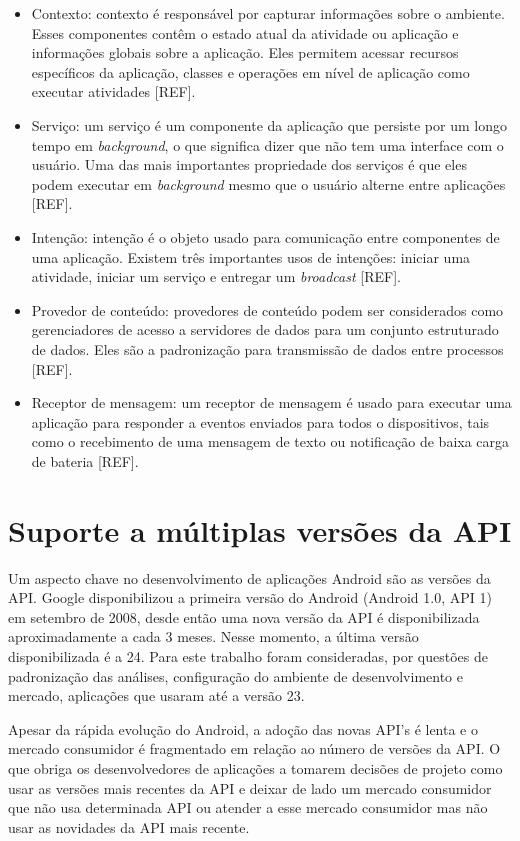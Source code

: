 \begin{itemize}
    \item Contexto: contexto é responsável por capturar informações sobre o ambiente.
    Esses componentes contêm o estado atual da atividade ou aplicação e informações
    globais sobre a aplicação. Eles permitem acessar recursos específicos da aplicação,
    classes e operações em nível de aplicação como executar atividades [REF].
    \item Serviço: um serviço é um componente da aplicação que persiste por um
    longo tempo em \textit{background}, o que significa dizer que não tem uma
    interface com o usuário. Uma das mais importantes propriedade dos serviços é
    que eles podem executar em \textit{background} mesmo que o usuário alterne entre aplicações [REF]. 
    \item Intenção: intenção é o objeto usado para comunicação entre componentes
    de uma aplicação. Existem três importantes usos de intenções: iniciar uma
    atividade, iniciar um serviço e entregar um \textit{broadcast} [REF].
    \item Provedor de conteúdo: provedores de conteúdo podem ser considerados
    como gerenciadores de acesso a servidores de dados para um conjunto estruturado
    de dados. Eles são a padronização para transmissão de dados entre processos [REF].
    \item Receptor de mensagem: um receptor de mensagem é usado para executar uma
    aplicação para responder a eventos enviados para todos o dispositivos, tais
    como o recebimento de uma mensagem de texto ou notificação de baixa carga de bateria [REF].
\end{itemize}



\section{Suporte a múltiplas versões da API} \label{sec:suporte-multiversao}

Um aspecto chave no desenvolvimento de aplicações Android são as versões da API.
Google disponibilizou a primeira versão do Android (Android 1.0, API 1) em setembro
de 2008, desde então uma nova versão da API é disponibilizada aproximadamente a
cada 3 meses. Nesse momento, a última versão disponibilizada é a 24. Para este
trabalho foram consideradas, por questões de padronização das análises, configuração
do ambiente de desenvolvimento e mercado, aplicações que usaram até a versão 23.

Apesar da rápida evolução do Android, a adoção das novas API’s é lenta e o mercado
consumidor é fragmentado em relação ao número de versões da API. O que obriga os
desenvolvedores de aplicações a tomarem decisões de projeto como usar as versões
mais recentes da API e deixar de lado um mercado consumidor que não usa determinada
API ou atender a esse mercado consumidor mas não usar as novidades da API mais recente.

